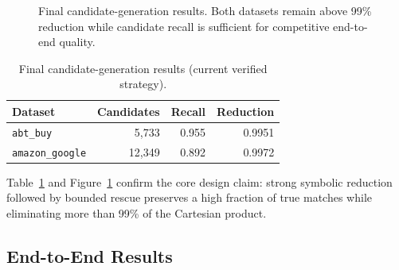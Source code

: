 \documentclass[10pt,twocolumn]{article}
\begin{document}
\begin{figure}[t]
\centering
{}
\caption{Final candidate-generation results. Both datasets remain above 99\%
  reduction while candidate recall is sufficient for competitive end-to-end
  quality.}
\label{fig:candidategraph}
\end{figure}

\begin{table}[t]
\centering
\caption{Final candidate-generation results (current verified strategy).}
\label{tab:candidates}
\small
\begin{tabular}{lrrr}
\toprule
Dataset & Candidates & Recall & Reduction \\
\midrule
\texttt{abt\_buy}       & 5,733  & 0.955 & 0.9951 \\
\texttt{amazon\_google} & 12,349 & 0.892 & 0.9972 \\
\bottomrule
\end{tabular}
\end{table}

Table~\ref{tab:candidates} and Figure~\ref{fig:candidategraph} confirm the
core design claim: strong symbolic reduction followed by bounded rescue
preserves a high fraction of true matches while eliminating more than 99\%
of the Cartesian product.

\subsection{End-to-End Results}
\end{document}
